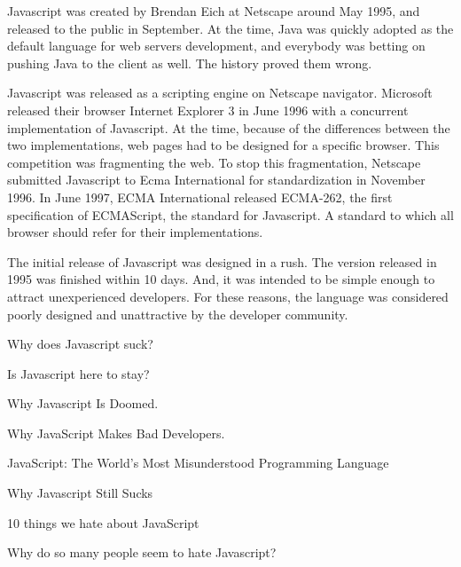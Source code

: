 Javascript was created by Brendan Eich at Netscape around May 1995, and released to the public in September.
At the time, Java was quickly adopted as the default language for web servers development, and everybody was betting on pushing Java to the client as well.
The history proved them wrong.

Javascript was released as a scripting engine on Netscape navigator.
Microsoft released their browser Internet Explorer 3 in June 1996 with a concurrent implementation of Javascript.
At the time, because of the differences between the two implementations, web pages had to be designed for a specific browser.
This competition was fragmenting the web.
To stop this fragmentation, Netscape submitted Javascript to Ecma International for standardization in November 1996.
In June 1997, ECMA International released ECMA-262, the first specification of ECMAScript, the standard for Javascript.
A standard to which all browser should refer for their implementations.

The initial release of Javascript was designed in a rush. The version released in 1995 was finished within 10 days.
And, it was intended to be simple enough to attract unexperienced developers.
For these reasons, the language was considered poorly designed and unattractive by the developer community.


{
\fontsize{10pt}{10pt}\selectfont
Why does Javascript suck?

Is Javascript here to stay?

Why Javascript Is Doomed.

Why JavaScript Makes Bad Developers.

JavaScript: The World's Most Misunderstood Programming Language

Why Javascript Still Sucks

10 things we hate about JavaScript

Why do so many people seem to hate Javascript?
}


